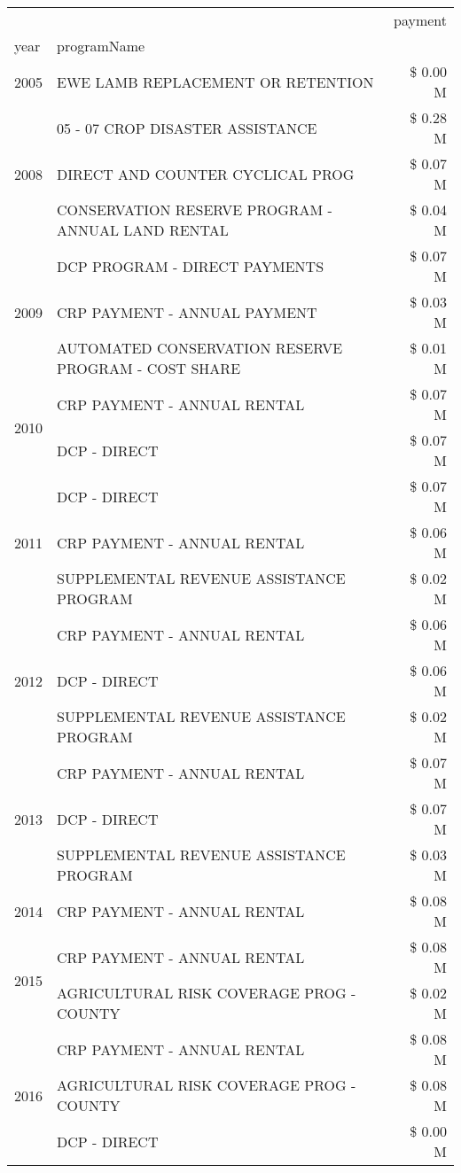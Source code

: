 \begin{tabular}{llr}
\toprule
 &  & payment \\
year & programName &  \\
\midrule
2005 & EWE LAMB REPLACEMENT OR RETENTION & \$ 0.00 M \\
\cline{1-3}
\multirow[t]{3}{*}{2008} & 05 - 07 CROP DISASTER ASSISTANCE & \$ 0.28 M \\
 & DIRECT AND COUNTER CYCLICAL PROG & \$ 0.07 M \\
 & CONSERVATION RESERVE PROGRAM - ANNUAL LAND RENTAL & \$ 0.04 M \\
\cline{1-3}
\multirow[t]{3}{*}{2009} & DCP PROGRAM - DIRECT PAYMENTS & \$ 0.07 M \\
 & CRP PAYMENT - ANNUAL PAYMENT & \$ 0.03 M \\
 & AUTOMATED CONSERVATION RESERVE PROGRAM - COST SHARE & \$ 0.01 M \\
\cline{1-3}
\multirow[t]{2}{*}{2010} & CRP PAYMENT - ANNUAL RENTAL & \$ 0.07 M \\
 & DCP - DIRECT & \$ 0.07 M \\
\cline{1-3}
\multirow[t]{3}{*}{2011} & DCP - DIRECT & \$ 0.07 M \\
 & CRP PAYMENT - ANNUAL RENTAL & \$ 0.06 M \\
 & SUPPLEMENTAL REVENUE ASSISTANCE PROGRAM & \$ 0.02 M \\
\cline{1-3}
\multirow[t]{3}{*}{2012} & CRP PAYMENT - ANNUAL RENTAL & \$ 0.06 M \\
 & DCP - DIRECT & \$ 0.06 M \\
 & SUPPLEMENTAL REVENUE ASSISTANCE PROGRAM & \$ 0.02 M \\
\cline{1-3}
\multirow[t]{3}{*}{2013} & CRP PAYMENT - ANNUAL RENTAL & \$ 0.07 M \\
 & DCP - DIRECT & \$ 0.07 M \\
 & SUPPLEMENTAL REVENUE ASSISTANCE PROGRAM & \$ 0.03 M \\
\cline{1-3}
2014 & CRP PAYMENT - ANNUAL RENTAL & \$ 0.08 M \\
\cline{1-3}
\multirow[t]{2}{*}{2015} & CRP PAYMENT - ANNUAL RENTAL & \$ 0.08 M \\
 & AGRICULTURAL RISK COVERAGE PROG - COUNTY & \$ 0.02 M \\
\cline{1-3}
\multirow[t]{3}{*}{2016} & CRP PAYMENT - ANNUAL RENTAL & \$ 0.08 M \\
 & AGRICULTURAL RISK COVERAGE PROG - COUNTY & \$ 0.08 M \\
 & DCP - DIRECT & \$ 0.00 M \\

\end{tabular}
